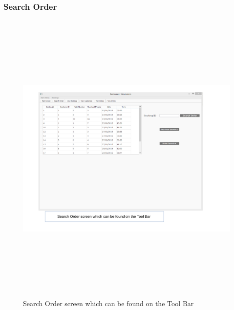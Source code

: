 \begin{landscape}
\subsubsection{Search Order}
\begin{figure}[H]
    \includegraphics[height = 15cm]{./Maintenance/images/screen17}
    \caption{Search Order screen which can be found on the Tool Bar} \label{fig:screen17}
\end{figure}


\end{landscape}
